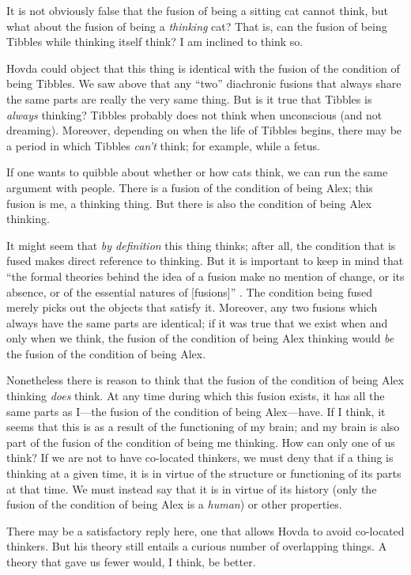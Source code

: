 \documentclass[12pt,twoside]{reedfancy}
\begin{document}
\begin{spacing}{1.25}
It is not obviously false that the fusion of being a sitting cat
cannot think, but what about the fusion of being a {\em thinking} cat?
That is, can the fusion of being Tibbles while thinking itself think?
I am inclined to think so.

Hovda could object that this thing is identical with the fusion of the
condition of being Tibbles.  We saw above that any ``two'' diachronic
fusions that always share the same parts are really the very same
thing.  But is it true that Tibbles is {\em always} thinking?  Tibbles
probably does not think when unconscious (and not dreaming).
Moreover, depending on when the life of Tibbles begins, there may be a
period in which Tibbles {\em can't} think; for example, while a fetus.

If one wants to quibble about whether or how cats think, we can run
the same argument with people.  There is a fusion of the condition of
being Alex; this fusion is me, a thinking thing.  But there is also
the condition of being Alex thinking.

It might seem that {\em by definition} this thing thinks; after all,
the condition that is fused makes direct reference to thinking.  But
it is important to keep in mind that ``the formal theories behind the
idea of a fusion make no mention of change, or its absence, or of the
essential natures of [fusions]'' \citep[sec. 1]{hovda2011}.  The
condition being fused merely picks out the objects that satisfy it.
Moreover, any two fusions which always have the same parts are
identical; if it was true that we exist when and only when we think,
the fusion of the condition of being Alex thinking would {\em be} the
fusion of the condition of being Alex.

Nonetheless there is reason to think that the fusion of the condition
of being Alex thinking {\em does} think.  At any time during which
this fusion exists, it has all the same parts as I---the fusion of the
condition of being Alex---have.  If I think, it seems that this is as
a result of the functioning of my brain; and my brain is also part of
the fusion of the condition of being me thinking.  How can only one of
us think?  If we are not to have co-located thinkers, we must deny
that if a thing is thinking at a given time, it is in virtue of the
structure or functioning of its parts at that time.  We must instead
say that it is in virtue of its history (only the fusion of the
condition of being Alex is a {\em human}) or other properties.

There may be a satisfactory reply here, one that allows Hovda to avoid
co-located thinkers.  But his theory still entails a curious number of
overlapping things.  A theory that gave us fewer would, I think, be
better.


\end{spacing}
\end{document}
